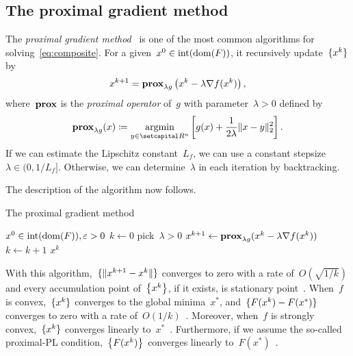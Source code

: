 \documentclass[../../main]{subfiles}
\begin{document}
\subsection{The proximal gradient method} \label{sec:intro:composite:pgm}
The \emph{proximal gradient method}~\cite{Fukushima1981} is one of the most common algorithms for solving~\cref{eq:composite}.
For a given~$x^0 \in \interior (\dom (F))$, it recursively update~$\set{x^k} $ by
\[
    x^{k + 1} = \prox_{\lambda g} \left( x^k - \lambda \nabla f(x^k) \right) 
,\] 
where~$\prox$ is the \emph{proximal operator} of~$g$ with parameter~$\lambda > 0$ defined by
\[
    \prox_{\lambda g}(x) \coloneqq \argmin_{y \in \setR^n} \left[ g(x) + \frac{1}{2 \lambda} \norm{x - y}_2^2 \right] 
.\] 
If we can estimate the Lipschitz constant~$L_f$, we can use a constant stepsize~$\lambda \in (0, 1 / L_f]$.
Otherwise, we can determine~$\lambda$ in each iteration by backtracking.

The description of the algorithm now follows.
\begin{algorithm}[hbtp]
    \caption{The proximal gradient method}
    \label{alg:pgm}
    \begin{algorithmic}[1]
        \Require $x^0 \in \interior (\dom (F)), \varepsilon > 0$
        \State $k \gets 0$
        \Repeat
        \State pick~$\lambda > 0$
        \State $x^{k + 1} \gets \prox_{\lambda g}(x^k - \lambda \nabla f(x^k))$
        \State $k \gets k + 1$
        \State \Return $x^k$
    \end{algorithmic}
\end{algorithm}

With this algorithm,~$\set{\norm{x^{k + 1} - x^k}}$ converges to zero with a rate of~$O(\sqrt{1 / k})$ and every accumulation point of~$\set*{x^k}$, if it exists, is stationary point~\cite{Beck2017}.
When~$f$ is convex,~$\set{x^k}$ converges to the global minima~$x^\ast$, and~$\set{F(x^k) - F(x^\ast)}$ converges to zero with a rate of~$O(1 / k)$~\cite{Beck2017}.
Moreover, when~$f$ is strongly convex,~$\set{x^k}$ converges linearly to~$x^\ast$~\cite{Beck2017}.
Furthermore, if we assume the so-called proximal-PL condition,~$\set*{F(x^k)}$ converges linearly to~$F(x^\ast)$~\cite{Karimi2016}.
\end{document}
